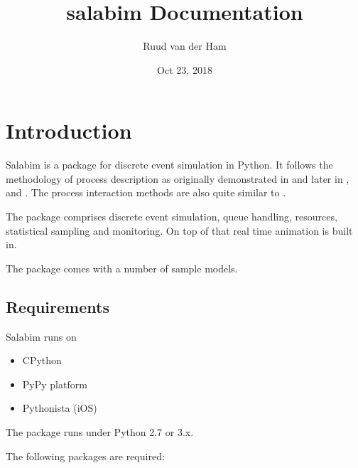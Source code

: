\documentclass[letterpaper,10pt,english]{sphinxmanual}
\title{salabim Documentation}
\date{Oct 23, 2018}
\author{Ruud van der Ham}
\begin{document}
\maketitle
\sphinxtableofcontents
{}\label{\detokenize{index::doc}}



\chapter{Introduction}
\label{\detokenize{Introduction:introduction}}\label{\detokenize{Introduction::doc}}
Salabim is a package for discrete event simulation in Python.
It follows the methodology of process description as originally demonstrated in 
and later in ,  and . 
The process interaction methods are also quite similar to .

The package comprises discrete event simulation, queue handling, resources, statistical sampling and monitoring.
On top of that real time animation is built in.

The package comes with a number of sample models.


\section{Requirements}
\label{\detokenize{Introduction:requirements}}
Salabim runs on
\begin{itemize}
\item {} 
CPython

\item {} 
PyPy platform

\item {} 
Pythonista (iOS)

\end{itemize}

The package runs under Python 2.7 or 3.x.

The following packages are required:
\end{document}
